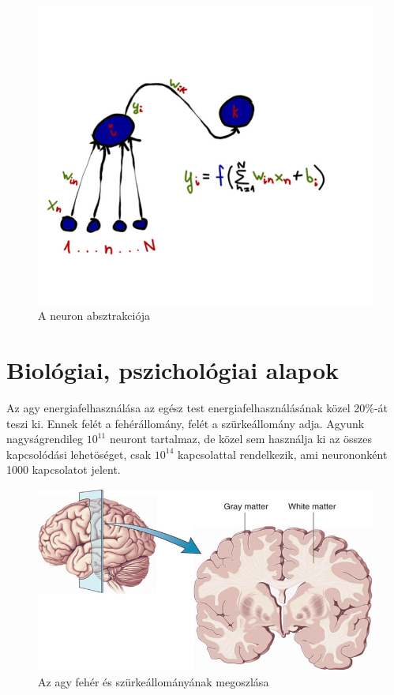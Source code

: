 \documentclass{article}
\begin{document}
\begin{figure}[h!]
\centering
\includegraphics[width=\textwidth,height=\textheight,keepaspectratio]{abstractneuron.png}
\caption{A neuron absztrakciója}
\label{fig:abstractneuron}
\end{figure}

\section{Biológiai, pszichológiai alapok}
Az agy energiafelhasználása az egész test energiafelhasználásának közel 20\%-át teszi ki. Ennek felét a fehérállomány, felét a szürkeállomány adja. Agyunk nagyságrendileg $10^{11}$ neuront tartalmaz, de közel sem használja ki az összes kapcsolódási lehetöséget, csak $10^{14}$ kapcsolattal rendelkezik, ami neurononként 1000 kapcsolatot jelent. \newline

\begin{figure}[h!]
\centering
\includegraphics[width=\textwidth,height=\textheight,keepaspectratio]{brain.png}
\caption{Az agy fehér és szürkeállományának megoszlása}
\label{fig:brain}
\end{figure}
\end{document}
